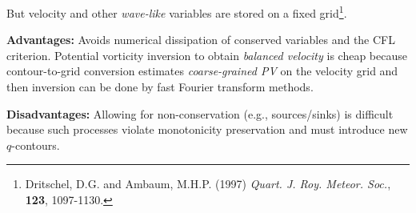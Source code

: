 	But velocity and other {\em wave-like} variables are stored on a fixed
	grid\footnote{\BTi Dritschel, D.G. and Ambaum, M.H.P. (1997) \emph{ Quart. J. Roy. Meteor. Soc.}, {\bf 123},
		1097-1130.\ETi}.
	
	{\bf Advantages:} Avoids numerical dissipation of conserved variables
	and the CFL criterion. Potential vorticity inversion to obtain {\em
		balanced velocity} is cheap because contour-to-grid conversion
	estimates {\em coarse-grained PV} on the velocity grid and then inversion
	can be done by fast Fourier transform methods.
	
	{\bf Disadvantages:} Allowing for non-conservation (e.g.,
	sources/sinks) is difficult because such processes violate
	monotonicity preservation and must introduce new $q$-contours.
	
	